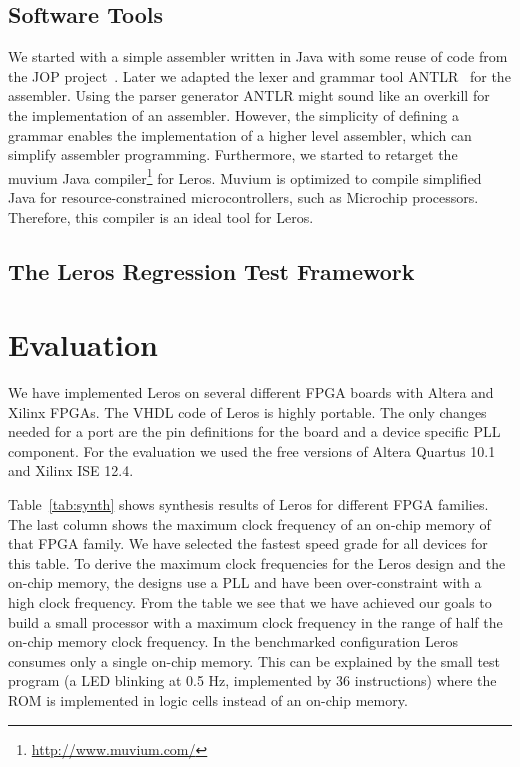 \documentclass[a4paper,fontsize=10pt,twoside,DIV15,BCOR12mm,headinclude=true,footinclude=false,pagesize,bibtotoc]{scrbook}
\begin{document}
\subsection{Software Tools}

We started with a simple assembler written in Java with some reuse of code from the JOP project~\cite{jop:jnl:jsa2007}. Later we adapted the lexer and grammar tool ANTLR~\cite{antlr:1995} for the assembler. Using the parser generator ANTLR might sound like an overkill for the implementation of an assembler. However, the simplicity of defining a grammar enables the implementation of a  higher level assembler, which can simplify assembler programming. Furthermore, we started to retarget the muvium Java compiler\footnote{\url{http://www.muvium.com/}} for Leros. Muvium is optimized to compile simplified Java for resource-constrained microcontrollers, such as Microchip processors. Therefore, this compiler is an ideal tool for Leros.

\subsection{The Leros Regression Test Framework}

\section{Evaluation}
\label{sec:eval}

We have implemented Leros on several different FPGA boards with Altera and Xilinx FPGAs. The VHDL code of Leros is highly portable. The only changes needed for a port are the pin definitions for the board and a device specific PLL component. For the evaluation we used the free versions of Altera Quartus 10.1 and Xilinx ISE 12.4.


Table~\ref{tab:synth} shows synthesis results of Leros for different FPGA families. The last column shows the maximum clock frequency of an on-chip memory of that FPGA family. We have selected the fastest speed grade for all devices for this table. To derive the maximum clock frequencies for the Leros design and the on-chip memory, the designs use a PLL and have been over-constraint with a high clock frequency.
From the table we see that we have achieved our goals to build a small processor with a maximum clock frequency in the range of half the on-chip memory clock frequency. In the benchmarked configuration Leros consumes only a single on-chip memory. This can be explained by the small test program (a LED blinking at 0.5 Hz, implemented by 36 instructions) where the ROM is implemented in logic cells instead of an on-chip memory.
\end{document}
